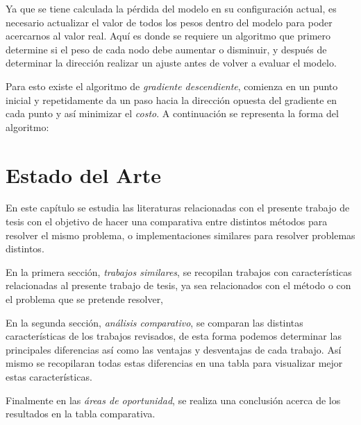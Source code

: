 Ya que se tiene calculada la pérdida del modelo en su configuración actual, es necesario actualizar el valor de todos los pesos dentro del modelo para poder acercarnos al valor real. Aquí es donde se requiere un algoritmo que primero determine si el peso de cada nodo debe aumentar o disminuir, y después de determinar la dirección realizar un ajuste antes de volver a evaluar el modelo.

Para esto existe el algoritmo de \emph{gradiente descendiente}, comienza en un punto inicial y repetidamente da un paso hacia la dirección opuesta del gradiente en cada punto y así minimizar el \emph{costo}. A continuación se representa la forma del algoritmo:




%
%           


\chapter{Estado del Arte}
En este capítulo se estudia las literaturas relacionadas con el presente trabajo de tesis con el objetivo de hacer una comparativa entre distintos métodos para resolver el mismo problema, o implementaciones similares para resolver problemas distintos.

En la primera sección, \emph{trabajos similares}, se recopilan trabajos con características relacionadas al presente trabajo de tesis, ya sea relacionados con el método o con el problema que se pretende resolver, 

En la segunda sección, \emph{análisis comparativo}, se comparan las distintas características de los trabajos revisados, de esta forma podemos determinar las principales diferencias así como las ventajas y desventajas de cada trabajo. Así mismo se recopilaran todas estas diferencias en una tabla para visualizar mejor estas características.

Finalmente en las \emph{áreas de oportunidad}, se realiza una conclusión acerca de los resultados en la tabla comparativa.

